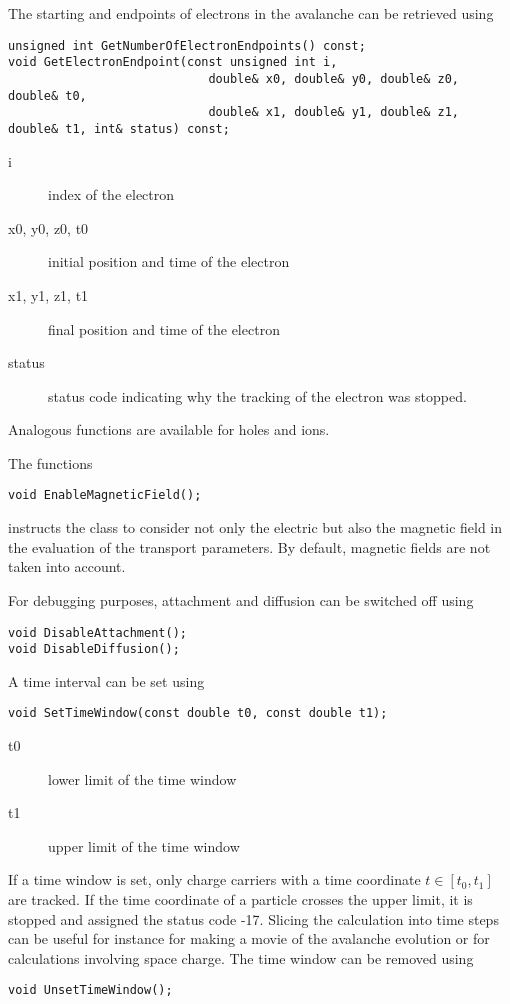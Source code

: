 The starting and endpoints of electrons in the avalanche can be 
retrieved using
\begin{lstlisting}
unsigned int GetNumberOfElectronEndpoints() const;
void GetElectronEndpoint(const unsigned int i, 
                            double& x0, double& y0, double& z0, double& t0,
                            double& x1, double& y1, double& z1, double& t1, int& status) const;
\end{lstlisting}
\begin{description}
  \item[i] index of the electron
  \item[x0, y0, z0, t0] initial position and time of the electron
  \item[x1, y1, z1, t1] final position and time of the electron
  \item[status] status code indicating why the tracking of the electron was stopped.  
\end{description}
Analogous functions are available for holes and ions.

The functions
\begin{lstlisting}
void EnableMagneticField();
\end{lstlisting}
instructs the class to consider not only the electric but also the magnetic field
in the evaluation of the transport parameters.  
By default, magnetic fields are not taken into account.

For debugging purposes, attachment and diffusion can be switched off using
\begin{lstlisting}
void DisableAttachment();
void DisableDiffusion();
\end{lstlisting}

A time interval can be set using
\begin{lstlisting}
void SetTimeWindow(const double t0, const double t1);
\end{lstlisting}
\begin{description}
  \item[t0] lower limit of the time window
  \item[t1] upper limit of the time window 
\end{description}
If a time window is set, 
only charge carriers with a time coordinate \(t \in \left[t_{0}, t_{1}\right]\) 
are tracked. If the time coordinate of a particle crosses the upper limit, 
it is stopped and assigned the status code -17.
Slicing the calculation into time steps can be useful for instance 
for making a movie of the avalanche evolution 
or for calculations involving space charge.
The time window can be removed using
\begin{lstlisting}
void UnsetTimeWindow();
\end{lstlisting}

